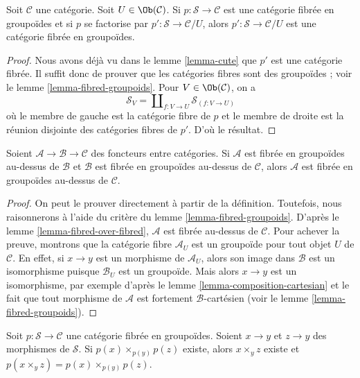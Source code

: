 \begin{lemma}
\label{lemma-cute-groupoids}
Soit $\mathcal{C}$ une catégorie. Soit $U \in \Ob(\mathcal{C})$.
Si $p : \mathcal{S} \to \mathcal{C}$ est une catégorie fibrée en groupoïdes
et si $p$ se factorise par $p' : \mathcal{S} \to \mathcal{C}/U$,
alors $p' : \mathcal{S} \to \mathcal{C}/U$ est une catégorie fibrée en groupoïdes.
\end{lemma}

\begin{proof}
Nous avons déjà vu dans le lemme \ref{lemma-cute} que $p'$ est une catégorie
fibrée. Il suffit donc de prouver que les catégories fibres sont des groupoïdes ;
voir le lemme \ref{lemma-fibred-groupoids}.
Pour $V \in \Ob(\mathcal{C})$, on a
$$
\mathcal{S}_V = \coprod\nolimits_{f : V \to U} \mathcal{S}_{(f : V \to U)}
$$
où le membre de gauche est la catégorie fibre de $p$ et le membre de droite
est la réunion disjointe des catégories fibres de $p'$.
D'où le résultat.
\end{proof}

\begin{lemma}
\label{lemma-fibred-in-groupoids-over-fibred-in-groupoids}
Soient $\mathcal{A} \to \mathcal{B} \to \mathcal{C}$ des foncteurs entre
catégories. Si $\mathcal{A}$ est fibrée en groupoïdes au-dessus de $\mathcal{B}$
et $\mathcal{B}$ est fibrée en groupoïdes au-dessus de $\mathcal{C}$, alors
$\mathcal{A}$ est fibrée en groupoïdes au-dessus de $\mathcal{C}$.
\end{lemma}

\begin{proof}
On peut le prouver directement à partir de la définition. Toutefois, nous raisonnerons
à l'aide du critère du lemme \ref{lemma-fibred-groupoids}.
D'après le lemme \ref{lemma-fibred-over-fibred}, $\mathcal{A}$
est fibrée au-dessus de $\mathcal{C}$. Pour achever la preuve, montrons que la catégorie
fibre $\mathcal{A}_U$ est un groupoïde pour tout objet $U$ de $\mathcal{C}$.
En effet, si $x \to y$ est un morphisme de $\mathcal{A}_U$, alors son
image dans $\mathcal{B}$ est un isomorphisme puisque $\mathcal{B}_U$ est
un groupoïde. Mais alors $x \to y$ est un isomorphisme, par exemple d'après le
lemme \ref{lemma-composition-cartesian} et le fait que tout
morphisme de $\mathcal{A}$ est fortement $\mathcal{B}$-cartésien
(voir le lemme \ref{lemma-fibred-groupoids}).
\end{proof}

\begin{lemma}
\label{lemma-fibred-groupoids-fibre-product-goes-up}
Soit $p : \mathcal{S} \to \mathcal{C}$ une catégorie fibrée en groupoïdes.
Soient $x \to y$ et $z \to y$ des morphismes de $\mathcal{S}$.
Si $p(x) \times_{p(y)} p(z)$ existe, alors
$x \times_y z$ existe et $p(x \times_y z) = p(x) \times_{p(y)} p(z)$.
\end{lemma}

